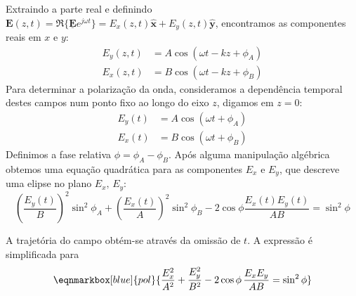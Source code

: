 Extraindo a parte real e definindo $\mathbf{E}(z,t) = \Re\{\mathbf{\underline{E}}e^{j\omega t}\} = E_x(z,t) \mathbf{\hat{x}} + E_y(z,t) \mathbf{\hat{y}}$, encontramos as componentes reais em $x$ e $y$:
\begin{equation}
    \begin{aligned}
        E_y(z,t) &= A \cos(\omega t - kz + \phi_A)\\
        E_x(z,t) &= B \cos(\omega t - kz + \phi_B)
    \end{aligned}
\end{equation}
Para determinar a polarização da onda, consideramos a dependência temporal destes campos num ponto fixo ao longo do eixo $z$, digamos em $z = 0$:
\begin{equation}
    \begin{aligned}
        E_y(t) &= A \cos(\omega t + \phi_A)\\
        E_x(t) &= B \cos(\omega t + \phi_B)
    \end{aligned}
\end{equation}
Definimos a fase relativa $\phi = \phi_A - \phi_B$. Após alguma manipulação algébrica obtemos uma equação quadrática para as componentes $E_x$ e $E_y$, que descreve uma elipse no plano $E_x,\,E_y$:
\begin{equation}
    \left( \frac{E_y(t)}{B} \right)^2 \sin^2 \phi_A + \left( \frac{E_x(t)}{A} \right)^2 \sin^2 \phi_B - 2 \cos \phi \frac{E_x(t)E_y(t)}{AB} = \sin^2 \phi
\end{equation}

A trajetória do campo obtém-se através da omissão de $t$. A expressão  é simplificada para%
\begin{equation}\label{eq:polarization-eq} 
     \eqnmarkbox[blue]{pol}{\frac{E_x^2}{A^2} + \frac{E_y^2}{B^2} - 2 \cos \phi\, \frac{E_xE_y}{AB} = \sin^2 \phi}
\end{equation}

